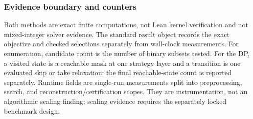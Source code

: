 \subsubsection{Evidence boundary and counters}
Both methods are exact finite computations, not Lean kernel verification and
not mixed-integer solver evidence.  The standard result object records the
exact objective and checked selections separately from wall-clock
measurements.  For enumeration, candidate count is the number of binary
subsets tested.  For the DP, a visited state is a reachable mask at one
strategy layer and a transition is one evaluated skip or take relaxation;
the final reachable-state count is reported separately.  Runtime fields are
single-run measurements split into preprocessing, search, and
reconstruction/certification scopes.  They are instrumentation, not an
algorithmic scaling finding; scaling evidence requires the separately locked
benchmark design.
